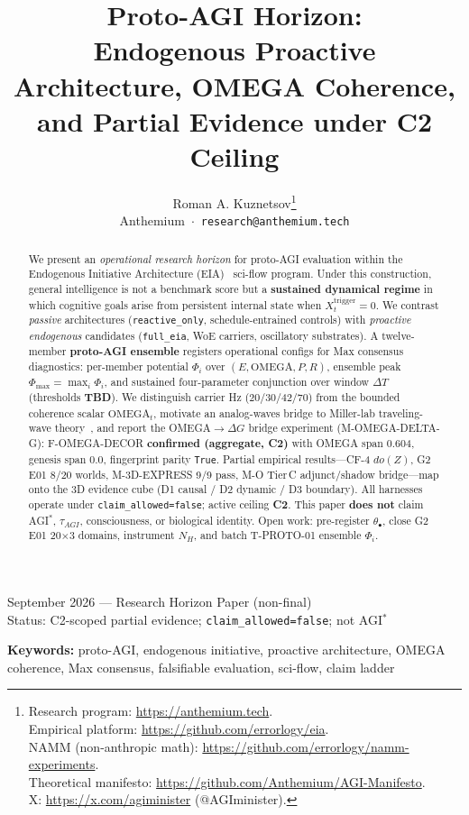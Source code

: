 \documentclass[11pt,a4paper]{article}
\title{Proto-AGI Horizon:\\
Endogenous Proactive Architecture, OMEGA Coherence, and Partial Evidence under C2 Ceiling}
\author{Roman A. Kuznetsov\thanks{%
Research program: \href{https://anthemium.tech}{https://anthemium.tech}.\\%
Empirical platform: \href{https://github.com/errorlogy/eia}{https://github.com/errorlogy/eia}.\\%
NAMM (non-anthropic math): \href{https://github.com/errorlogy/namm-experiments}{https://github.com/errorlogy/namm-experiments}.\\%
Theoretical manifesto: \href{https://github.com/Anthemium/AGI-Manifesto}{https://github.com/Anthemium/AGI-Manifesto}.\\%
X: \href{https://x.com/agiminister}{https://x.com/agiminister} (@AGIminister).%
}\\
Anthemium \,$\cdot$\, \texttt{research@anthemium.tech}
}
\date{}
\theoremstyle{definition}
\begin{document}
\maketitle

\noindent\small
September 2026 --- Research Horizon Paper (non-final)\\
Status: C2-scoped partial evidence; \texttt{claim\_allowed=false}; not AGI$^{*}$

\vspace{0.5em}

\begin{abstract}
We present an \emph{operational research horizon} for proto-AGI evaluation within the Endogenous Initiative Architecture (EIA)~\cite{kuznetsov2026eia} sci-flow program. Under this construction, general intelligence is not a benchmark score but a \textbf{sustained dynamical regime} in which cognitive goals arise from persistent internal state when $X_t^{\mathrm{trigger}}=0$. We contrast \emph{passive} architectures (\texttt{reactive\_only}, schedule-entrained controls) with \emph{proactive endogenous} candidates (\texttt{full\_eia}, WoE carriers, oscillatory substrates). A twelve-member \textbf{proto-AGI ensemble} registers operational configs for Max consensus diagnostics: per-member potential $\Phi_i$ over $(E,\mathrm{OMEGA},P,R)$, ensemble peak $\Phi_{\max}=\max_i\Phi_i$, and sustained four-parameter conjunction over window $\Delta T$ (thresholds \textbf{TBD}). We distinguish carrier Hz (20/30/42/70) from the bounded coherence scalar $\mathrm{OMEGA}_t$, motivate an analog-waves bridge to Miller-lab traveling-wave theory~\cite{miller2026analog}, and report the OMEGA$\to\Delta G$ bridge experiment (M-OMEGA-DELTA-G): F-OMEGA-DECOR \textbf{confirmed (aggregate, C2)} with OMEGA span 0.604, genesis span 0.0, fingerprint parity \texttt{True}. Partial empirical results---CF-4 $do(Z)$, G2 E01 8/20 worlds, M-3D-EXPRESS 9/9 pass, M-O Tier\,C adjunct/shadow bridge---map onto the 3D evidence cube (D1 causal / D2 dynamic / D3 boundary). All harnesses operate under \texttt{claim\_allowed=false}; active ceiling \textbf{C2}. This paper \textbf{does not} claim AGI$^{*}$, $\tau_{AGI}$, consciousness, or biological identity. Open work: pre-register $\theta_\bullet$, close G2 E01 20$\times$3 domains, instrument $N_H$, and batch T-PROTO-01 ensemble $\Phi_i$.
\end{abstract}

\noindent\textbf{Keywords:} proto-AGI, endogenous initiative, proactive architecture, OMEGA coherence, Max consensus, falsifiable evaluation, sci-flow, claim ladder
\end{document}
